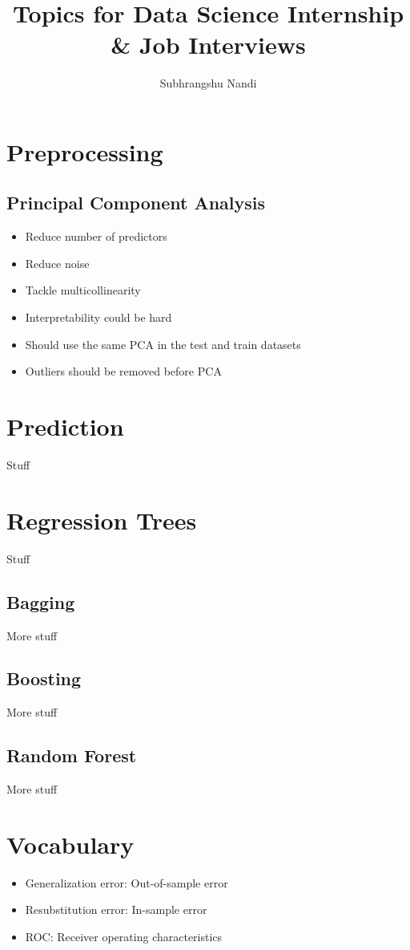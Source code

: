 \documentclass[11pt]{extarticle} %
\begin{document}
\title{Topics for Data Science Internship \& Job Interviews}
\author{Subhrangshu Nandi}
\date{}

\maketitle

\tableofcontents
\newpage

\section{Preprocessing}
\subsection{Principal Component Analysis}
\begin{itemize}
\item Reduce number of predictors
\item Reduce noise
\item Tackle multicollinearity
\item Interpretability could be hard
\item Should use the same PCA in the test and train datasets
\item Outliers should be removed before PCA
\end{itemize}


\section{Prediction}
Stuff

\section{Regression Trees}
Stuff

\subsection{Bagging}
More stuff

\subsection{Boosting}
More stuff

\subsection{Random Forest}
More stuff

\section{Vocabulary}
\begin{itemize}
\item Generalization error: Out-of-sample error
\item Resubstitution error: In-sample error
\item ROC: Receiver operating characteristics
\end{itemize}
\end{document}
